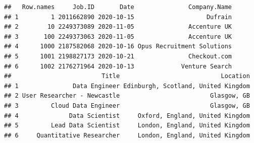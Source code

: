 \documentclass[
]{article}
\begin{document}
\begin{verbatim}
##   Row.names     Job.ID       Date               Company.Name
## 1         1 2011662890 2020-10-15                    Dufrain
## 2        10 2249373089 2020-11-05               Accenture UK
## 3       100 2249373063 2020-11-05               Accenture UK
## 4      1000 2187582068 2020-10-16 Opus Recruitment Solutions
## 5      1001 2198827173 2020-10-21               Checkout.com
## 6      1002 2176271964 2020-10-13             Venture Search
##                         Title                            Location
## 1               Data Engineer Edinburgh, Scotland, United Kingdom
## 2 User Researcher - Newcastle                         Glasgow, GB
## 3         Cloud Data Engineer                         Glasgow, GB
## 4              Data Scientist     Oxford, England, United Kingdom
## 5         Lead Data Scientist     London, England, United Kingdom
## 6     Quantitative Researcher     London, England, United Kingdom

\end{verbatim}
\end{document}
